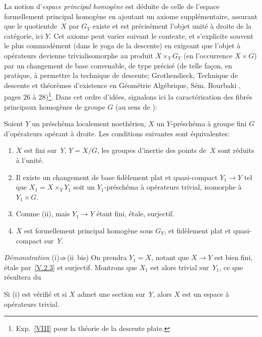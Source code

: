 La
notion d'\emph{espace principal homogène}
est d\'eduite de celle de l'espace formellement principal
homog\`ene en ajoutant un axiome suppl\'ementaire, assurant que le
\og quotient\fg de~$X$ par $G_Y$ existe et est pr\'ecis\'ement
l'objet unit\'e \`a droite de la cat\'egorie, ici $Y$. Cet
axiome peut varier suivant le contexte, et s'explicite souvent le plus
commod\'ement (dans le yoga de la \og descente\fg) en exigeant que
l'objet \`a op\'erateurs devienne \og trivial\fg \ie isomorphe au
produit $X \times_Y G_Y$ (en l'occurrence $X \times G$) par un
changement de base convenable, de type pr\'ecis\'e (de telle fa\c con, en pratique, \`a permettre la technique de descente;
\cf Grothendieck, Technique de descente et th\'eor\`emes
d'existence en G\'eom\'etrie Alg\'ebrique, S\'em. Bourbaki
, pages 26 \`a 28)\footnote{\Cf Exp.\, \ref{VIII} pour la
th\'eorie de la descente plate.}. Dans cet ordre d'id\'ees,
signalons ici la caract\'erisation des fibr\'es principaux
homog\`enes de groupe $G$ (au sens de \loccit):

\begin{proposition}
\label{V.2.6}
Soient $Y$ un pr\'esch\'ema localement noeth\'erien, $X$ un
$Y$-pr\'esch\'ema \`a groupe fini $G$ d'op\'erateurs
op\'erant \`a droite. Les conditions suivantes sont
\'equivalentes:
\begin{enumerate}
\item[(i)] $X$ est fini sur~$Y$, $Y=X/G$, les groupes d'inertie des
points de~$X$ sont r\'eduits \`a l'unit\'e.
\item[(ii)] Il existe un changement de base fid\`element plat et
quasi-compact $Y_1 \to Y$ tel que $X_1=X \times_Y Y_1$ soit un
$Y_1$-pr\'esch\'ema \`a op\'erateurs trivial, \ie isomorphe
\`a $Y_1 \times G$.
\item[(ii~bis)] Comme (ii), mais $Y_1 \to Y$ \'etant fini,
\'etale, surjectif.
\item[(iii)] $X$ est formellement principal homog\`ene sous $G_Y$,
et fid\`element plat et quasi-compact sur~$Y$.
\end{enumerate}
\end{proposition}
\textit{Démonstration} (i)$\To$(ii~bis) On prendra
$Y_1=X$, notant que $X \to Y$ est bien fini, \'etale par~\ref{V.2.3}
et surjectif. Montrons que $X_1$ est alors trivial sur~$Y_1$, ce que
r\'esultera du

\begin{corollaire}
\label{V.2.7} Si \textup{(i)} est v\'erifi\'e et si $X$ admet une
section sur~$Y$, alors $X$ est un espace \`a op\'erateurs trivial.
\end{corollaire}

